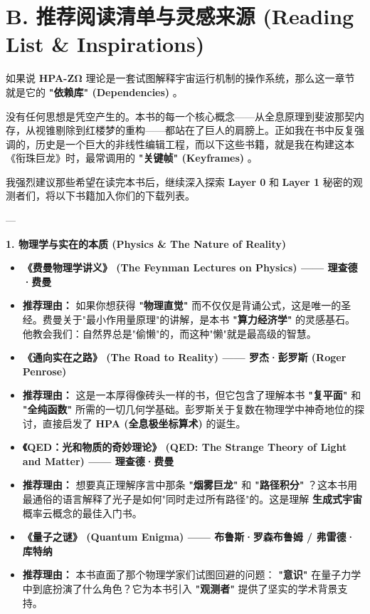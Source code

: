 \section*{B. 推荐阅读清单与灵感来源 (Reading List \& Inspirations)}

如果说 \textbf{HPA-ZΩ} 理论是一套试图解释宇宙运行机制的操作系统，那么这一章节就是它的 \textbf{"依赖库" (Dependencies)} 。

没有任何思想是凭空产生的。本书的每一个核心概念——从全息原理到斐波那契内存，从视锥剔除到红楼梦的重构——都站在了巨人的肩膀上。正如我在书中反复强调的，历史是一个巨大的非线性编辑工程，而以下这些书籍，就是我在构建这本《衔珠巨龙》时，最常调用的 \textbf{"关键帧" (Keyframes)} 。

我强烈建议那些希望在读完本书后，继续深入探索 \textbf{Layer 0} 和 \textbf{Layer 1} 秘密的观测者们，将以下书籍加入你们的下载列表。

---

\textbf{1. 物理学与实在的本质 (Physics \& The Nature of Reality)}

\begin{itemize}
\item \textbf{《费曼物理学讲义》 (The Feynman Lectures on Physics) —— 理查德·费曼}
\item \textbf{推荐理由：} 如果你想获得 \textbf{"物理直觉"} 而不仅仅是背诵公式，这是唯一的圣经。费曼关于"最小作用量原理"的讲解，是本书 \textbf{"算力经济学"} 的灵感基石。他教会我们：自然界总是"偷懒"的，而这种"懒"就是最高级的智慧。
\item \textbf{《通向实在之路》 (The Road to Reality) —— 罗杰·彭罗斯 (Roger Penrose)}
\item \textbf{推荐理由：} 这是一本厚得像砖头一样的书，但它包含了理解本书 \textbf{"复平面"} 和 \textbf{"全纯函数"} 所需的一切几何学基础。彭罗斯关于复数在物理学中神奇地位的探讨，直接启发了 \textbf{HPA (全息极坐标算术)} 的诞生。
\item \textbf{《QED：光和物质的奇妙理论》 (QED: The Strange Theory of Light and Matter) —— 理查德·费曼}
\item \textbf{推荐理由：} 想要真正理解序言中那条 \textbf{"烟雾巨龙"} 和 \textbf{"路径积分"} ？这本书用最通俗的语言解释了光子是如何"同时走过所有路径"的。这是理解 \textbf{生成式宇宙} 概率云概念的最佳入门书。
\item \textbf{《量子之谜》 (Quantum Enigma) —— 布鲁斯·罗森布鲁姆 / 弗雷德·库特纳}
\item \textbf{推荐理由：} 本书直面了那个物理学家们试图回避的问题： \textbf{"意识"} 在量子力学中到底扮演了什么角色？它为本书引入 \textbf{"观测者"} 提供了坚实的学术背景支持。
\end{itemize}

